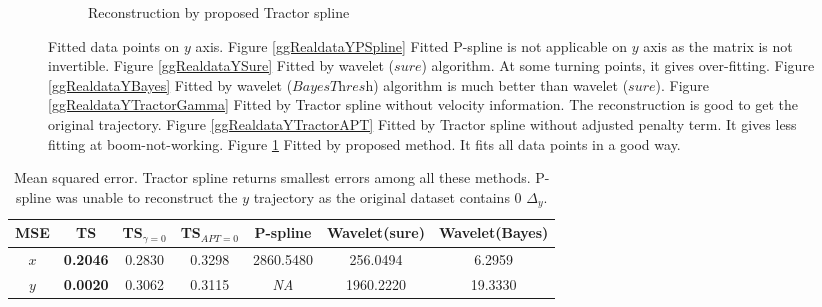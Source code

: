 \begin{figure}
\begin{subfigure}{0.45\textwidth}
    \caption{Reconstruction by proposed Tractor spline}\label{ggRealdataYTractor}
    \end{subfigure}
\caption{Fitted data points on $y$ axis. Figure \ref{ggRealdataYPSpline} Fitted P-spline is not applicable on $y$ axis as the matrix is not invertible. Figure \ref{ggRealdataYSure} Fitted by wavelet ($\textit{sure}$) algorithm. At some turning points, it gives over-fitting. Figure \ref{ggRealdataYBayes} Fitted by wavelet ($\textit{BayesThresh}$) algorithm is much better than wavelet ($\textit{sure}$). Figure \ref{ggRealdataYTractorGamma} Fitted by Tractor spline without velocity information. The reconstruction is good to get the original trajectory. Figure \ref{ggRealdataYTractorAPT} Fitted by Tractor spline without adjusted penalty term. It gives less fitting at boom-not-working. Figure \ref{ggRealdataYTractor} Fitted by proposed method. It fits all data points in a good way.}\label{1dy}
 \end{figure}



\begin{table}
\caption{Mean squared error. Tractor spline returns smallest errors among all these methods. P-spline was unable to reconstruct the $y$ trajectory as the original dataset contains 0 $\Delta_y$.} \label{1dxymse}
	\setlength\tabcolsep{1.5pt}
\begin{center}
 	\begin{tabular}{|c|c|c|c|c|c|c|}
 		\hline
 		MSE   &  TS & TS$_{\gamma=0}$ & TS$_{APT=0}$   & P-spline & Wavelet(sure) & Wavelet(Bayes)\\ \hline
	\textit{$x$}   &  \textbf{0.2046} & 0.2830 & 0.3298     & 2860.5480   & 256.0494  & 6.2959  \\ \hline
	\textit{$y$}   &  \textbf{0.0020} & 0.3062 & 0.3115     & \textit{NA} & 1960.2220 & 19.3330  \\ \hline
 	\end{tabular}
 \end{center}
\end{table}


